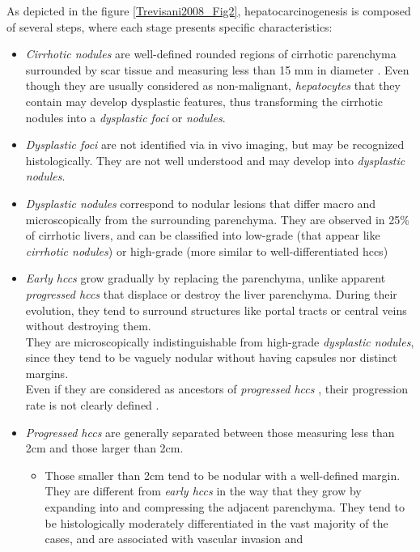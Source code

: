 As depicted in the figure \ref{Trevisani2008_Fig2}, hepatocarcinogenesis is composed of
several steps, where each stage presents specific characteristics:
\begin{itemize}
\item \emph{Cirrhotic nodules} are well-defined rounded regions of cirrhotic
  parenchyma surrounded by scar tissue and measuring less than 15 mm in
  diameter \cite{Zimmermann1995}. Even though they are
  usually considered as non-malignant, \emph{hepatocytes} that they
  contain may develop dysplastic features, thus transforming the
  cirrhotic nodules into a \emph{dysplastic foci} or \emph{nodules}.
\item \emph{Dysplastic foci} are not identified via in vivo imaging, but may
  be recognized histologically. They are not well understood and may
  develop into \emph{dysplastic nodules}.
\item \emph{Dysplastic nodules} correspond to nodular lesions that differ
  macro and microscopically from the surrounding parenchyma. They are
  observed in 25\% of cirrhotic livers, and can be classified into
  low-grade (that appear like \emph{cirrhotic nodules}) or high-grade (more
  similar to well-differentiated \ac{hcc}s)
\item \emph{Early \ac{hcc}s} grow gradually by replacing the parenchyma, unlike
  apparent \emph{progressed \ac{hcc}s} that displace or destroy the liver
  parenchyma. During their evolution, they tend to surround structures
  like portal tracts or central veins without destroying them.\\
  They are microscopically indistinguishable from high-grade \emph{dysplastic
  nodules}, since they tend to be vaguely nodular without having capsules
  nor distinct margins.\\
  Even if they are considered as ancestors of \emph{progressed \ac{hcc}s} \cite{Park2011}, their progression rate is not
  clearly defined \cite{Khalili2011}.
\item \emph{Progressed \ac{hcc}s} are generally separated between those measuring
  less than 2cm and those larger than 2cm.
  \begin{itemize}
  \item Those smaller than 2cm tend to be nodular with a well-defined
    margin. They are different from \emph{early \ac{hcc}s} in the way that
    they grow by expanding into and compressing the adjacent parenchyma.
    They tend to be histologically moderately differentiated in the vast
    majority of the cases, and are associated with vascular invasion and

\end{itemize}
\end{itemize}
